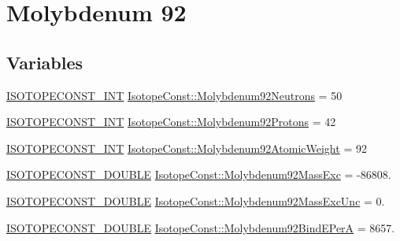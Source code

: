 \hypertarget{group___isotope_const-_molybdenum-_mo92}{}\section{Molybdenum 92}
\label{group___isotope_const-_molybdenum-_mo92}
\subsection*{Variables}
\begin{DoxyCompactItemize}
\item 
\mbox{\hyperlink{group___isotope_const-_macros_ga5f18360b3e99483a35c32d789e62621c}{I\+S\+O\+T\+O\+P\+E\+C\+O\+N\+S\+T\+\_\+\+I\+NT}} \mbox{\hyperlink{group___isotope_const-_molybdenum-_mo92_ga339e5ace808ad7068419e6ed38110e99}{Isotope\+Const\+::\+Molybdenum92\+Neutrons}} = 50
\item 
\mbox{\hyperlink{group___isotope_const-_macros_ga5f18360b3e99483a35c32d789e62621c}{I\+S\+O\+T\+O\+P\+E\+C\+O\+N\+S\+T\+\_\+\+I\+NT}} \mbox{\hyperlink{group___isotope_const-_molybdenum-_mo92_gad9072daf2b22ca33cbddd0ce6e265fd2}{Isotope\+Const\+::\+Molybdenum92\+Protons}} = 42
\item 
\mbox{\hyperlink{group___isotope_const-_macros_ga5f18360b3e99483a35c32d789e62621c}{I\+S\+O\+T\+O\+P\+E\+C\+O\+N\+S\+T\+\_\+\+I\+NT}} \mbox{\hyperlink{group___isotope_const-_molybdenum-_mo92_gadc9705ad39d4e885bc2bb4fad563d5ba}{Isotope\+Const\+::\+Molybdenum92\+Atomic\+Weight}} = 92
\item 
\mbox{\hyperlink{group___isotope_const-_macros_ga8f45a7272ce02c0b4c65c44636ed719a}{I\+S\+O\+T\+O\+P\+E\+C\+O\+N\+S\+T\+\_\+\+D\+O\+U\+B\+LE}} \mbox{\hyperlink{group___isotope_const-_molybdenum-_mo92_ga31440578c4b838a930de06c03ac0936e}{Isotope\+Const\+::\+Molybdenum92\+Mass\+Exc}} = -\/86808.
\item 
\mbox{\hyperlink{group___isotope_const-_macros_ga8f45a7272ce02c0b4c65c44636ed719a}{I\+S\+O\+T\+O\+P\+E\+C\+O\+N\+S\+T\+\_\+\+D\+O\+U\+B\+LE}} \mbox{\hyperlink{group___isotope_const-_molybdenum-_mo92_ga35266222dc3255811886ef7fa1cd4813}{Isotope\+Const\+::\+Molybdenum92\+Mass\+Exc\+Unc}} = 0.
\item 
\mbox{\hyperlink{group___isotope_const-_macros_ga8f45a7272ce02c0b4c65c44636ed719a}{I\+S\+O\+T\+O\+P\+E\+C\+O\+N\+S\+T\+\_\+\+D\+O\+U\+B\+LE}} \mbox{\hyperlink{group___isotope_const-_molybdenum-_mo92_ga6dbf9b16779246be7c2de275c8fbecee}{Isotope\+Const\+::\+Molybdenum92\+Bind\+E\+PerA}} = 8657.
\item 

\end{DoxyCompactItemize}
